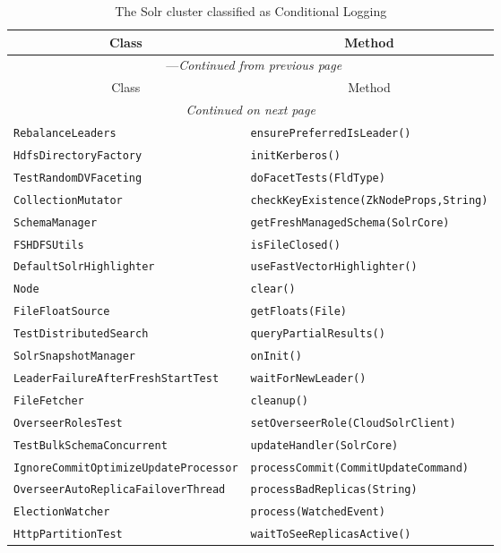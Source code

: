 \begin{center}
\begin{longtable}{ll}
\caption{The Solr cluster classified as Conditional Logging}\\
\toprule\multicolumn{1}{c}{Class}&\multicolumn{1}{c}{Method}\\\midrule
\endfirsthead

\multicolumn{2}{c}{\tablename\ \thetable{}---\textit{Continued from previous page}} \\\midrule
\multicolumn{1}{c}{Class}&\multicolumn{1}{c}{Method}\\\midrule
\endhead
\multicolumn{2}{c}{\textit{Continued on next page}}\\\midrule
\endfoot
\bottomrule
\endlastfoot
 \lstinline/RebalanceLeaders/&{\lstinline/ensurePreferredIsLeader()/}\\
 \lstinline/HdfsDirectoryFactory/&{\lstinline/initKerberos()/}\\
 \lstinline/TestRandomDVFaceting/&{\lstinline/doFacetTests(FldType)/}\\
 \lstinline/CollectionMutator/&{\lstinline/checkKeyExistence(ZkNodeProps,String)/}\\
 \lstinline/SchemaManager/&{\lstinline/getFreshManagedSchema(SolrCore)/}\\
 \lstinline/FSHDFSUtils/&{\lstinline/isFileClosed()/}\\
 \lstinline/DefaultSolrHighlighter/&{\lstinline/useFastVectorHighlighter()/}\\
 \lstinline/Node/&{\lstinline/clear()/}\\
 \lstinline/FileFloatSource/&{\lstinline/getFloats(File)/}\\
 \lstinline/TestDistributedSearch/&{\lstinline/queryPartialResults()/}\\
 \lstinline/SolrSnapshotManager/&{\lstinline/onInit()/}\\
 \lstinline/LeaderFailureAfterFreshStartTest/&{\lstinline/waitForNewLeader()/}\\
\lstinline/FileFetcher/&{\lstinline/cleanup()/}\\
 \lstinline/OverseerRolesTest/&{\lstinline/setOverseerRole(CloudSolrClient)/}\\
 \lstinline/TestBulkSchemaConcurrent/&{\lstinline/updateHandler(SolrCore)/}\\
 \lstinline/IgnoreCommitOptimizeUpdateProcessor/&{\lstinline/processCommit(CommitUpdateCommand)/}\\
 \lstinline/OverseerAutoReplicaFailoverThread/&{\lstinline/processBadReplicas(String)/}\\
 \lstinline/ElectionWatcher/&{\lstinline/process(WatchedEvent)/}\\
 \lstinline/HttpPartitionTest/&{\lstinline/waitToSeeReplicasActive()/}\\


\end{longtable}
\end{center}
